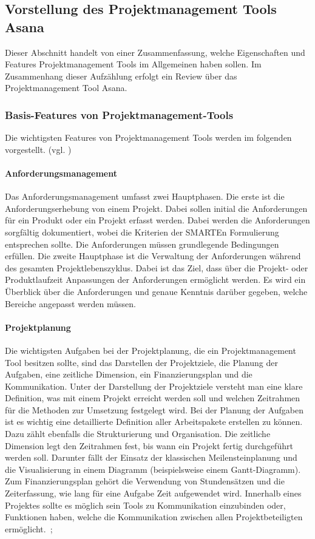 \documentclass[sigconf, nonacm]{acmart}
\begin{document}
\subsection{Vorstellung des Projektmanagement Tools Asana}\label{sec:asana}
Dieser Abschnitt handelt von einer Zusammenfassung, welche Eigenschaften und Features Projektmanagement Tools im Allgemeinen haben sollen. Im Zusammenhang dieser Aufzählung erfolgt ein Review über das Projektmanagement Tool Asana.

\subsubsection{Basis-Features von Projektmanagement-Tools}
Die wichtigsten Features von Projektmanagement Tools werden im folgenden vorgestellt. (vgl. \cite{noauthor_projektmanagement_nodate})

\paragraph{Anforderungsmanagement}
Das Anforderungsmanagement umfasst zwei Hauptphasen. Die erste ist die Anforderungserhebung von einem Projekt. Dabei sollen initial die Anforderungen für ein Produkt oder ein Projekt erfasst werden. Dabei werden die Anforderungen sorgfältig dokumentiert, wobei die Kriterien der SMARTEn Formulierung entsprechen sollte. Die Anforderungen müssen grundlegende Bedingungen erfüllen.
Die zweite Hauptphase ist die Verwaltung der Anforderungen während des gesamten Projektlebenszyklus.
Dabei ist das Ziel, dass über die Projekt- oder Produktlaufzeit Anpassungen der Anforderungen ermöglicht werden. Es wird ein Überblick über die Anforderungen und genaue Kenntnis darüber gegeben, welche Bereiche angepasst werden müssen. ~\citep{venzmer_anforderungsmanagement-tool_2020}

\paragraph{Projektplanung}
Die wichtigsten Aufgaben bei der Projektplanung, die ein Projektmanagement Tool besitzen sollte, sind das Darstellen der Projektziele, die Planung der Aufgaben, eine zeitliche Dimension, ein Finanzierungsplan und die Kommunikation. Unter der Darstellung der Projektziele versteht man eine klare Definition, was mit einem Projekt erreicht werden soll und welchen Zeitrahmen für die Methoden zur Umsetzung festgelegt wird. Bei der Planung der Aufgaben ist es wichtig eine detaillierte Definition aller Arbeitspakete erstellen zu können. Dazu zählt ebenfalls die Strukturierung und Organisation. Die zeitliche Dimension legt den Zeitrahmen fest, bis wann ein Projekt fertig durchgeführt werden soll. Darunter fällt der Einsatz der klassischen Meilensteinplanung und die Visualisierung in einem Diagramm (beispielsweise einem Gantt-Diagramm). Zum Finanzierungsplan gehört die Verwendung von Stundensätzen und die Zeiterfassung, wie lang für eine Aufgabe Zeit aufgewendet wird. Innerhalb eines Projektes sollte es möglich sein Tools zu Kommunikation einzubinden oder, Funktionen haben, welche die Kommunikation zwischen allen Projektbeteiligten ermöglicht.~\citep{venzmer_projektplaner-software_2020};
\end{document}
